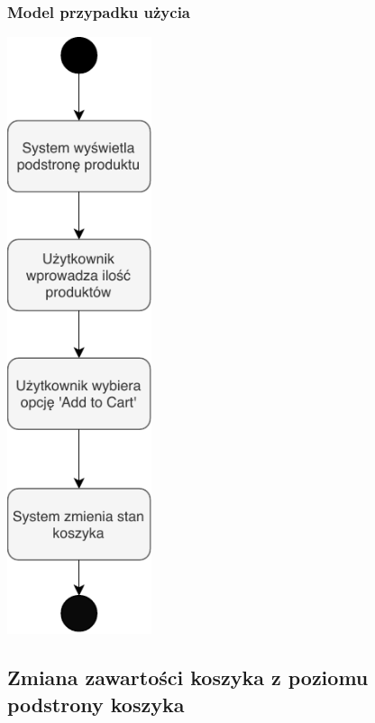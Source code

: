 \documentclass[12pt]{report}
\begin{document}
			\subsubsection{Model przypadku użycia}
				\begin{center}
					\includegraphics[width=120pt]{koszyk1.pdf}
				\end{center}
			
		
		\subsection{Zmiana zawartości koszyka z poziomu podstrony koszyka}
		
\end{document}
